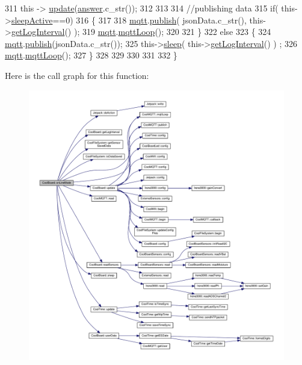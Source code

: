 \begin{DoxyCode}
311     \textcolor{keyword}{this} -> \hyperlink{classCoolBoard_a8612756d3f73198cdde857a66f0fe690}{update}(\hyperlink{classCoolBoard_a7b835fafd449e5282f7f91d787a2dc15}{answer}.c\_str());
312     
313 
314     \textcolor{comment}{//publishing data   }
315     \textcolor{keywordflow}{if}( this->\hyperlink{classCoolBoard_a0a51b2287139f66c738101fb53139230}{sleepActive}==0)    
316     \{   
317         
318         \hyperlink{classCoolBoard_a2399f44d7c23c1149a335cb3b46d90f1}{mqtt}.\hyperlink{classCoolMQTT_ace977b3e90ab14b1199fe5c4fb0a13ec}{publish}( jsonData.c\_str(), this->\hyperlink{classCoolBoard_aaa24480b273fc095a1356a589c333781}{getLogInterval}() );
319         \hyperlink{classCoolBoard_a2399f44d7c23c1149a335cb3b46d90f1}{mqtt}.\hyperlink{classCoolMQTT_aa5eaae967b562b62cbcf2b8d81f6e5d5}{mqttLoop}();
320     
321     \}
322     \textcolor{keywordflow}{else}
323     \{
324         \hyperlink{classCoolBoard_a2399f44d7c23c1149a335cb3b46d90f1}{mqtt}.\hyperlink{classCoolMQTT_ace977b3e90ab14b1199fe5c4fb0a13ec}{publish}(jsonData.c\_str());      
325         this->\hyperlink{classCoolBoard_a5d0c8ff93b615efd676be432de9f164a}{sleep}( this->\hyperlink{classCoolBoard_aaa24480b273fc095a1356a589c333781}{getLogInterval}() ) ;
326         \hyperlink{classCoolBoard_a2399f44d7c23c1149a335cb3b46d90f1}{mqtt}.\hyperlink{classCoolMQTT_aa5eaae967b562b62cbcf2b8d81f6e5d5}{mqttLoop}();
327     \}
328 
329     
330         
331         
332 \}
\end{DoxyCode}
Here is the call graph for this function\+:\nopagebreak
\begin{figure}[H]
\begin{center}
\leavevmode
\includegraphics[width=350pt]{classCoolBoard_aa0bbc4bc605e35618d18e68795c61363_cgraph}
\end{center}
\end{figure}
\mbox{\label{classCoolBoard_a486507b8f0981d3cc671ed31c2145755}} 
